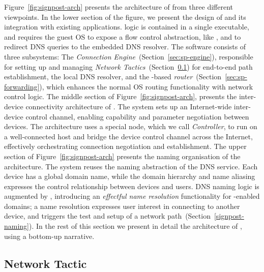 Figure~\ref{fig:signpost-arch} presents the architecture of \signpost from three
different viewpoints.  In the lower section of the figure, we present the design
of \signpost and its integration with existing applications.
\signpost logic is contained in a single executable, and requires the guest
OS to expose a flow control abstraction, like \of, and to redirect
DNS queries to the embedded DNS resolver.  The software consists of three
subsystems: The \textit{Connection Engine}~(Section~\ref{sec:sp-engine}),
responsible for setting up and managing \textit{Network
  Tactics}~(Section~\ref{sec:sp-tactics}) for end-to-end path establishment,
the local DNS resolver, and the \of-based \textit{\signpost
  router}~(Section~\ref{sec:sp-forwarding}), which enhances the normal OS routing
functionality with \signpost network control logic.
The middle section of Figure~\ref{fig:signpost-arch}, presents the inter-device
connectivity architecture of \signpost. The system sets up an Internet-wide
inter-device control channel, enabling capability and parameter negotiation
between devices. The architecture  uses a special \signpost node, which we call
\emph{\signpost Controller}, to run on a well-connected host and bridge the
device control channel across the Internet, effectively orchestrating connection
negotiation and establishment.
%
The upper section of Figure~\ref{fig:signpost-arch} presents the naming
organisation of the \signpost architecture. The system reuses the naming
abstraction of the DNS service. Each device has a global domain name, while the
domain hierarchy and name aliasing expresses the control relationship between
devices and users.  DNS naming logic is augmented by \signpost, introducing an
\textit{effectful name resolution} functionality for \signpost-enabled domains;
a name resolution expresses user interest in connecting to another device, and
triggers the test and setup of a network path~(Section~\ref{signpost-naming}).
In the rest of this section we present in detail the architecture of \signpost,
using a bottom-up narrative.

\subsection{Network Tactic} \label{sec:sp-tactics}


